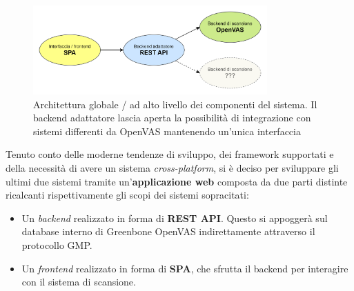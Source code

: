 \begin{figure}
    \centering
    \includegraphics[width=0.8\textwidth]{img/systems-highlevel.png}
    \caption{Architettura globale / ad alto livello dei componenti del sistema. Il backend adattatore lascia aperta la possibilità di integrazione con sistemi differenti da OpenVAS mantenendo un'unica interfaccia}
\end{figure}

Tenuto conto delle moderne tendenze di sviluppo, dei framework supportati e della necessità di avere un sistema \emph{cross-platform}, si è deciso per sviluppare gli ultimi due sistemi tramite un'\textbf{applicazione web} composta da due parti distinte ricalcanti rispettivamente gli scopi dei sistemi sopracitati:
\begin{itemize}
    \item Un \emph{backend} realizzato in forma di \textbf{REST API}. Questo si appoggerà sul database interno di Greenbone OpenVAS indirettamente attraverso il protocollo GMP.
    \item Un \emph{frontend} realizzato in forma di \textbf{SPA}, che sfrutta il backend per interagire con il sistema di scansione.
\end{itemize}


